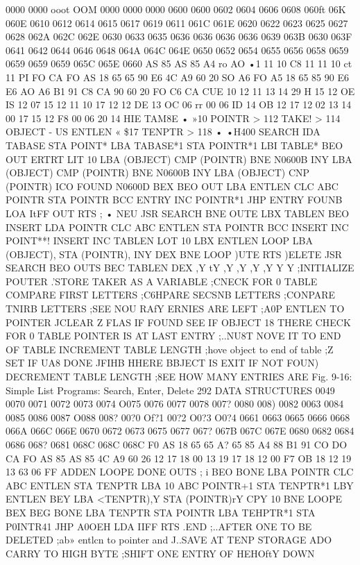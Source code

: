 \documentclass{book}
\begin{document}
{0000
0000
ooot
OOM
0000
0000
0000
0600
0600
0602
0604
0606
0608
060ft
06K
060E
0610
0612
0614
0615
0617
0619
0611
061C
061E
0620
0622
0623
0625
0627
0628
062A
062C
062E
0630
0633
0635
0636
0636
0636
0636
0639
063B
0630
063F
0641
0642
0644
0646
0648
064A
064C
064E
0650
0652
0654
0655
0656
0658
0659
0659
0659
0659
065C
065E
0660
AS
85
AS
85
A4
ro
AO
•1
11
10
C8
11
11
10
ct
11
PI
FO
CA
FO
AS
18
65
65
90
E6
4C
A9
60
20
SO
A6
FO
A5
18
65
85
90
E6
E6
AO
A6
B1
91
C8
CA
90
60
20
FO
C6
CA
CUE
10
12
11
13
14
29
H
15
12
OE
IS
12
07
15
12
11
10
17
12
12
DE
13
OC 06
rr
00 06
ID
14
OB
12
17
12
02
13
14
00
17
15
12
F8
00 06
20
14
HIE
TAM8E • »10
POINTR > 112
TAKE! > 114
OBJECT - US
ENTLEN « \$17
TENPTR > 118
•
•H400
SEARCH IDA TABASE
STA POINT*
LBA TABASE*1
STA POINTR*1
LBI TABLE*
BEO OUT
ERTRT LIT 10
LBA (OBJECT)
CMP (POINTR)
BNE N0600B
INY
LBA (OBJECT)
CMP (POINTR)
BNE N0600B
INY
LBA (OBJECT)
CNP (POINTR)
ICO FOUND
N0600D BEX
BEO OUT
LBA ENTLEN
CLC
ABC POINTR
STA POINTR
BCC ENTRY
INC POINTR*1
JHP ENTRY
FOUNB LOA ItFF
OUT RTS
;
•
NEU JSR SEARCH
BNE OUTE
LBX TABLEN
BEO INSERT
LDA POINTR
CLC
ABC ENTLEN
STA POINTR
BCC INSERT
INC POINT**!
INSERT INC TABLEN
LOT 10
LBX ENTLEN
LOOP LBA (OBJECT),
STA (POINTR),
INY
DEX
BNE LOOP
)UTE RTS
)ELETE JSR SEARCH
BEO OUTS
BEC TABLEN
DEX
,Y
tY
,Y
,Y
,Y
,Y
Y
Y
;INITIALIZE POUTER
.'STORE TAKER AS A VARIABLE
;CNECK FOR 0 TABLE
{COMPARE FIRST LETTERS
;C6HPARE SECSNB LETTERS
;CONPARE TNIRB LETTERS
;SEE NOU RAfY ERNIES ARE LEFT
;A0P ENTLEN TO POINTER
JCLEAR Z FLAS IF FOUND
{SEE IF OBJECT 18 THERE
{CHECK FOR 0 TABLE
{POINTER IS AT LAST ENTRY
;..NU8T NOVE IT TO END OF TABLE
{INCREMENT TABLE LENGTH
;hove object to end of table
;Z SET IF UA8 DONE
JFIHB HHERE BBJECT IS
{EXIT IF NOT FOUN)
{DECREMENT TABLE LENGTH
;8EE HOW MANY ENTRIES ARE
Fig. 9-16: Simple List Programs: Search, Enter, Delete
292
DATA STRUCTURES
0049
0070
0071
0072
0073
0074
O075
0076
0077
0078
007?
0080
008)
0082
0063
0084
0085
0086
0087
O088
008?
00?0
Of?1
00?2
O0?3
O0?4
0661
0663
0665
0666
0668
066A
066C
066E
0670
0672
0673
0675
0677
067?
067B
067C
067E
0680
0682
0684
0686
068?
0681
068C
068C
068C
F0
AS
18
65
65
A?
65
85
A4
88
B1
91
CO
DO
CA
FO
AS
85
AS
85
4C
A9
60
26
12
17
18
00
13
19
17
18
12
00
F7
OB
18
12
19
13
63 06
FF
ADDEN
LOOPE
DONE
OUTS
;
i
BEO BONE
LBA POINTR
CLC
ABC ENTLEN
STA TENPTR
LBA 10
ABC POINTR+1
STA TENPTR*1
LBY ENTLEN
BEY
LBA <TENPTR),Y
STA (POINTR)rY
CPY 10
BNE LOOPE
BEX
BEG BONE
LBA TENPTR
STA POINTR
LBA TEHPTR*1
STA P0INTR41
JHP A0OEH
LDA IIFF
RTS
.END
;..AFTER ONE TO BE DELETED
;ab» entlcn to pointer and
J..SAVE AT TENP STORAGE
{ADO CARRY TO HIGH BYTE
;SHIFT ONE ENTRY OF HEHOftY DOWN
}}}}}}}}}
\end{document}

